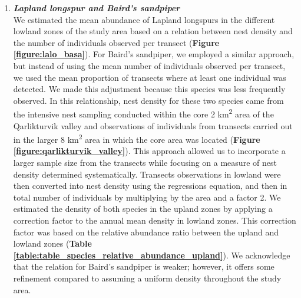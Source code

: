 \documentclass[a4paper,twoside,12pt]{article}
\begin{document}
\begin{enumerate}[label=\alph*.]
                \item[] \textit{\textbf{Lapland longspur and Baird’s sandpiper}}\\
                We estimated the mean abundance of Lapland longspurs in the different lowland zones of the study area based on a relation between nest density and the number of individuals observed per transect (\textbf{Figure \ref{figure:lalo_basa}}). For Baird’s sandpiper, we employed a similar approach, but instead of using the mean number of individuals observed per transect, we used the mean proportion of transects where at least one individual was detected. We made this adjustment because this species was less frequently observed. In this relationship, nest density for these two species came from the intensive nest sampling conducted within the core 2 km\textsuperscript{2} area of the Qarlikturvik valley and observations of individuals from transects carried out in the larger 8 km\textsuperscript{2} area in which the core area was located (\textbf{Figure \ref{figure:qarlikturvik_valley}}). This approach allowed us to incorporate a larger sample size from the transects while focusing on a measure of nest density determined systematically. Transects observations in lowland were then converted into nest density using the regressions equation, and then in total number of individuals by multiplying by the area and a factor 2. We estimated the density of both species in the upland zones by applying a correction factor to the annual mean density in lowland zones. This correction factor was based on the relative abundance ratio between the upland and lowland zones (\textbf{Table \ref{table:table_species_relative_abundance_upland}}). We acknowledge that the relation for Baird’s sandpiper is weaker; however, it offers some refinement compared to assuming a uniform density throughout the study area. 
                

\end{enumerate}
\end{document}
